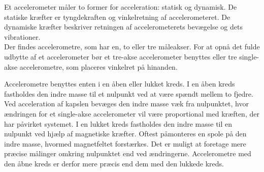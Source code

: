 Et accelerometer måler to former for acceleration: statisk og dynamisk. De statiske kræfter er tyngdekraften og vinkelretning af accelerometeret. De dynamiske kræfter beskriver retningen af accelerometerets bevægelse og dets vibrationer. \citep{Sparkfun,Engineering, Goodrich2013} \\
Der findes accelerometre, som har en, to eller tre måleakser. For at opnå det fulde udbytte af et accelerometer bør et tre-akse accelerometer benyttes eller tre single-akse accelerometre, som placeres vinkelret på hinanden.\citep{TittertonWeston2004} 

Accelerometre benyttes enten i en åben eller lukket kreds. I en åben kreds fastholdes den indre masse til et nulpunkt ved at være spændt mellem to fjedre. Ved acceleration af kapslen bevæges den indre masse væk fra nulpunktet, hvor ændringen for et single-akse accelerometer vil være proportional med kræften, der har påvirket systemet. I en lukket kreds fastholdes den indre masse til en nulpunkt ved hjælp af magnetiske kræfter. Oftest påmonteres en spole på den indre masse, hvormed magnetfeltet forstærkes. Det er muligt at foretage mere præcise målinger omkring nulpunktet end ved ændringerne. Accelerometre med den åbne kreds er derfor mere præcis end dem med den lukkede kreds. 

